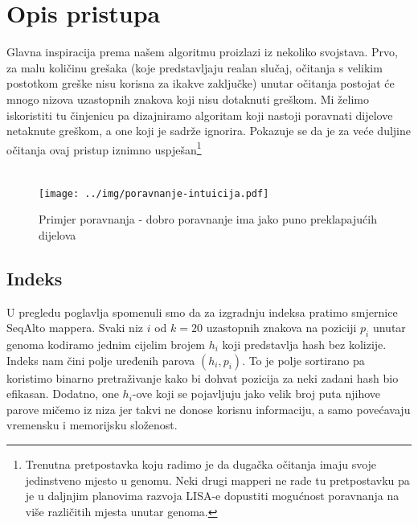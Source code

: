 \documentclass[times, utf8, diplomski]{fer}
\begin{document}
\section{Opis pristupa}

Glavna inspiracija prema našem algoritmu proizlazi iz nekoliko svojstava. Prvo, za malu količinu grešaka (koje predstavljaju realan slučaj, očitanja s velikim postotkom greške nisu korisna za ikakve zaključke) unutar očitanja postojat će mnogo nizova uzastopnih znakova koji nisu dotaknuti greškom. Mi želimo iskoristiti tu činjenicu pa dizajniramo algoritam koji nastoji poravnati dijelove netaknute greškom, a one koji je sadrže ignorira. Pokazuje se da je za veće duljine očitanja ovaj pristup iznimno uspješan\footnote{Trenutna pretpostavka koju radimo je da dugačka očitanja imaju svoje jedinstveno mjesto u genomu. Neki drugi mapperi ne rade tu pretpostavku pa je u daljnjim planovima razvoja LISA-e dopustiti mogućnost poravnanja na više različitih mjesta unutar genoma.}
\\
\\

\begin{figure}[H]
\centering
\texttt{[image: ../img/poravnanje-intuicija.pdf]}
\caption{Primjer poravnanja - dobro poravnanje ima jako puno preklapajućih dijelova}\label{poravnanje-intuicija}
\end{figure}

\subsection{Indeks}
U pregledu poglavlja spomenuli smo da za izgradnju indeksa pratimo smjernice SeqAlto mappera. Svaki niz $i$ od $k=20$ uzastopnih znakova na poziciji $p_i$ unutar genoma kodiramo jednim cijelim brojem $h_i$ koji predstavlja hash bez kolizije. Indeks nam čini polje uređenih parova $(h_i, p_i)$. To je polje sortirano pa koristimo binarno pretraživanje kako bi dohvat pozicija za neki zadani hash bio efikasan. Dodatno, one $h_i$-ove koji se pojavljuju jako velik broj puta njihove parove mičemo iz niza jer takvi ne donose korisnu informaciju, a samo povećavaju vremensku i memorijsku složenost. 
\end{document}
